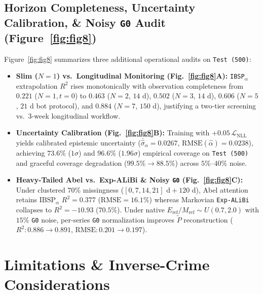 \documentclass[10pt,twocolumn,a4paper]{article}
\begin{document}
\subsection{Horizon Completeness, Uncertainty Calibration, \& Noisy \texttt{G0} Audit (Figure~\ref{fig:fig8})}

Figure~\ref{fig:fig8} summarizes three additional operational audits on \texttt{Test (500)}:
\begin{itemize}\setlength{\itemsep}{1pt}\setlength{\parskip}{0pt}
  \item \textbf{Slim ($N=1$) vs.\ Longitudinal Monitoring (Fig.~\ref{fig:fig8}A):} \texttt{IBSP}$_\alpha$ extrapolation $R^2$ rises monotonically with observation completeness from $0.221$ ($N=1, t=0$) to $0.463$ ($N=2$, $14\text{ d}$), $0.502$ ($N=3$, $14\text{ d}$), $0.606$ ($N=5$, $21\text{ d}$ bot protocol), and $0.884$ ($N=7$, $150\text{ d}$), justifying a two-tier screening vs.\ 3-week longitudinal workflow.
  \item \textbf{Uncertainty Calibration (Fig.~\ref{fig:fig8}B):} Training with $+0.05\,\mathcal{L}_{\text{NLL}}$ yields calibrated epistemic uncertainty ($\bar{\hat{\sigma}}_\alpha = 0.0267$, $\text{RMSE}(\hat{\alpha}) = 0.0238$), achieving $73.6\%$ ($1\sigma$) and $96.6\%$ ($1.96\sigma$) empirical coverage on \texttt{Test (500)} and graceful coverage degradation ($99.5\% \to 88.5\%$) across $5\%\text{--}40\%$ noise.
  \item \textbf{Heavy-Tailed Abel vs.\ Exp-ALiBi \& Noisy \texttt{G0} (Fig.~\ref{fig:fig8}C):} Under clustered $70\%$ missingness ($[0,7,14,21]\text{ d} + 120\text{ d}$), Abel attention retains $\text{IBSP}_\alpha$ $R^2 = 0.377$ ($\text{RMSE}=16.1\%$) whereas Markovian \texttt{Exp-ALiBi} collapses to $R^2 = -10.93$ ($70.5\%$). Under native $E_{\text{ref}}/M_{\text{ref}} \sim U(0.7, 2.0)$ with $15\%$ \texttt{G0} noise, per-series \texttt{G0} normalization improves $\tilde{P}$ reconstruction ($R^2: 0.886 \to 0.891$, $\text{RMSE}: 0.201 \to 0.197$).
\end{itemize}

\section{Limitations \& Inverse-Crime Considerations}
\end{document}
